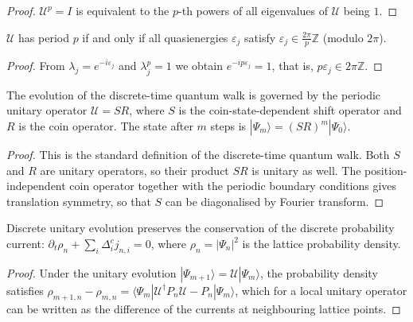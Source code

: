 \begin{proof}
$\mathcal{U}^p=I$ is equivalent to the $p$-th powers of all eigenvalues of $\mathcal{U}$ being $1$.
\end{proof}

\begin{corollary}\label{cor:period_quasienergy}
$\mathcal{U}$ has period $p$ if and only if all quasienergies $\varepsilon_j$ satisfy $\varepsilon_j\in\frac{2\pi}{p}\mathbb{Z}$ (modulo $2\pi$).
\end{corollary}

\begin{proof}
From $\lambda_j=e^{-i\varepsilon_j}$ and $\lambda_j^p=1$ we obtain $e^{-ip\varepsilon_j}=1$, that is, $p\varepsilon_j\in 2\pi\mathbb{Z}$.
\end{proof}

\begin{proposition}\label{prop:dtqw_evolution}
The evolution of the discrete-time quantum walk is governed by the periodic unitary operator $\mathcal{U}=SR$, where $S$ is the coin-state-dependent shift operator and $R$ is the coin operator. The state after $m$ steps is $|\Psi_m\rangle=(SR)^m|\Psi_0\rangle$.
\end{proposition}

\begin{proof}
This is the standard definition of the discrete-time quantum walk. Both $S$ and $R$ are unitary operators, so their product $SR$ is unitary as well. The position-independent coin operator together with the periodic boundary conditions gives translation symmetry, so that $S$ can be diagonalised by Fourier transform.
\end{proof}

\begin{proposition}\label{prop:discrete_current_conservation}
Discrete unitary evolution preserves the conservation of the discrete probability current: $\partial_t\rho_n+\sum_i\Delta_i^cj_{n,i}=0$, where $\rho_n=|\Psi_n|^2$ is the lattice probability density.
\end{proposition}

\begin{proof}
Under the unitary evolution $|\Psi_{m+1}\rangle=\mathcal{U}|\Psi_m\rangle$, the probability density satisfies $\rho_{m+1,n}-\rho_{m,n}=\langle\Psi_m|\mathcal{U}^\dagger P_n\mathcal{U}-P_n|\Psi_m\rangle$, which for a local unitary operator can be written as the difference of the currents at neighbouring lattice points.
\end{proof}

